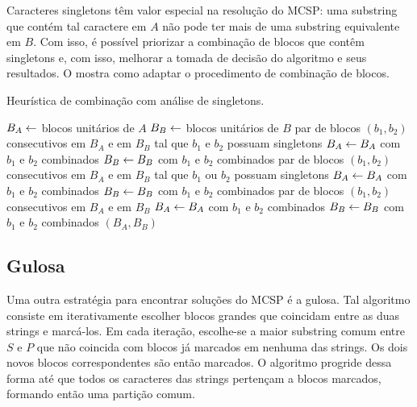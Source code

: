         Caracteres singletons têm valor especial na resolução do MCSP: uma substring que contém tal caractere em $A$ não pode ter mais de uma substring equivalente em $B$. Com isso, é possível priorizar a combinação de blocos que contêm singletons e, com isso, melhorar a tomada de decisão do algoritmo e seus resultados. O  mostra como adaptar o procedimento de combinação de blocos.

        \begin{algorithm}[htb]
        \caption{Heurística de combinação com análise de singletons.} \label{alg:combineS}
        \begin{codebox}
        \li $B_A \leftarrow$ blocos unitários de $A$
        \li $B_B \leftarrow$ blocos unitários de $B$
        \li \Para \Cada par de blocos $(b_1, b_2)$ consecutivos em $B_A$ e em $B_B$
        \zi tal que $b_1$ e $b_2$ possuam singletons \Faca
            \Do
        \li     $B_A \leftarrow B_A$ com $b_1$ e $b_2$ combinados
        \li     $B_B \leftarrow B_B$ com $b_1$ e $b_2$ combinados
            \End
        \li \Para \Cada par de blocos $(b_1, b_2)$ consecutivos em $B_A$ e em $B_B$
        \zi tal que $b_1$ ou $b_2$ possuam singletons \Faca
            \Do
        \li     $B_A \leftarrow B_A$ com $b_1$ e $b_2$ combinados
        \li     $B_B \leftarrow B_B$ com $b_1$ e $b_2$ combinados
            \End
        \li \Para \Cada par de blocos $(b_1, b_2)$ consecutivos em $B_A$ e em $B_B$ \Faca
            \Do
        \li     $B_A \leftarrow B_A$ com $b_1$ e $b_2$ combinados
        \li     $B_B \leftarrow B_B$ com $b_1$ e $b_2$ combinados
            \End
        \li \Devolva $(B_A, B_B)$
        \end{codebox}
    \end{algorithm}

\subsection{Gulosa}

    Uma outra estratégia para encontrar soluções do MCSP é a gulosa. Tal algoritmo consiste em iterativamente escolher blocos grandes que coincidam entre as duas strings e marcá-los. Em cada iteração, escolhe-se a maior substring comum entre $S$ e $P$ que não coincida com blocos já marcados em nenhuma das strings. Os dois novos blocos correspondentes são então marcados. O algoritmo progride dessa forma até que todos os caracteres das strings pertençam a blocos marcados, formando então uma partição comum.

